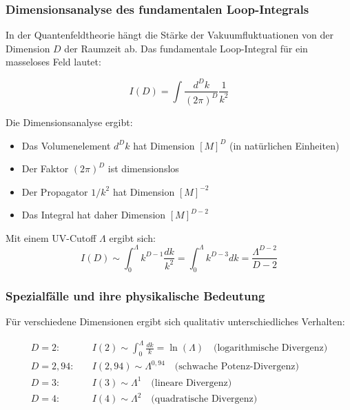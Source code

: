 \documentclass[12pt,a4paper]{article}
\theoremstyle{definition}
\begin{document}
	\subsubsection{Dimensionsanalyse des fundamentalen Loop-Integrals}
	
	In der Quantenfeldtheorie hängt die Stärke der Vakuumfluktuationen von der Dimension $D$ der Raumzeit ab. Das fundamentale Loop-Integral für ein masseloses Feld lautet:
	
	\begin{equation}
		I(D) = \int \frac{d^D k}{(2\pi)^D} \frac{1}{k^2}
	\end{equation}
	
	Die Dimensionsanalyse ergibt:
	\begin{itemize}
		\item Das Volumenelement $d^D k$ hat Dimension $[M]^D$ (in natürlichen Einheiten)
		\item Der Faktor $(2\pi)^D$ ist dimensionslos
		\item Der Propagator $1/k^2$ hat Dimension $[M]^{-2}$
		\item Das Integral hat daher Dimension $[M]^{D-2}$
	\end{itemize}
	
	Mit einem UV-Cutoff $\Lambda$ ergibt sich:
	\begin{equation}
		I(D) \sim \int_0^{\Lambda} k^{D-1} \frac{dk}{k^2} = \int_0^{\Lambda} k^{D-3} dk = \frac{\Lambda^{D-2}}{D-2}
	\end{equation}
	
	\subsubsection{Spezialfälle und ihre physikalische Bedeutung}
	
	Für verschiedene Dimensionen ergibt sich qualitativ unterschiedliches Verhalten:
	
	\begin{align}
		D = 2: \quad &I(2) \sim \int_0^{\Lambda} \frac{dk}{k} = \ln(\Lambda) \quad \text{(logarithmische Divergenz)}\\
		D = 2{,}94: \quad &I(2{,}94) \sim \Lambda^{0{,}94} \quad \text{(schwache Potenz-Divergenz)}\\
		D = 3: \quad &I(3) \sim \Lambda^{1} \quad \text{(lineare Divergenz)}\\
		D = 4: \quad &I(4) \sim \Lambda^{2} \quad \text{(quadratische Divergenz)}
	\end{align}
	
\end{document}
